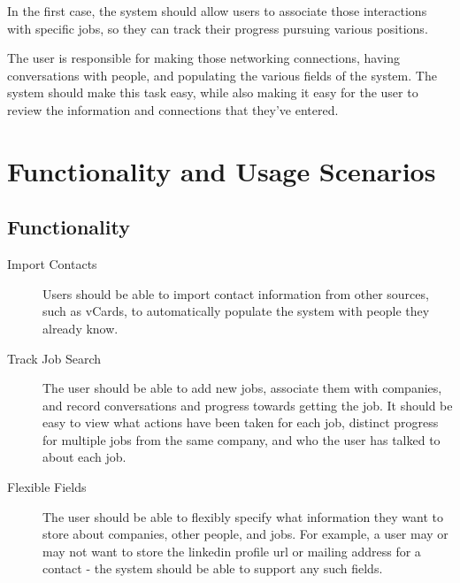 \documentclass[12pt, letter]{article}
\begin{document}
In the first case, the system should allow users to associate those interactions with specific jobs, so they can track their progress pursuing various positions.

The user is responsible for making those networking connections, having conversations with people, and populating the various fields of the system.  The system should make this task easy, while also making it easy for the user to review the information and connections that they've entered.

\section{Functionality and Usage Scenarios}
\subsection{Functionality}
\begin{description}
\item[Import Contacts] Users should be able to import contact information from other sources, such as vCards, to automatically populate the system with people they already know.
\item[Track Job Search] The user should be able to add new jobs, associate them with companies, and record conversations and progress towards getting the job.  It should be easy to view what actions have been taken for each job, distinct progress for multiple jobs from the same company, and who the user has talked to about each job.

\item[Flexible Fields] The user should be able to flexibly specify what information they want to store about companies, other people, and jobs.  For example, a user may or may not want to store the linkedin profile url or mailing address for a contact - the system should be able to support any such fields.
\end{description}
\end{document}
